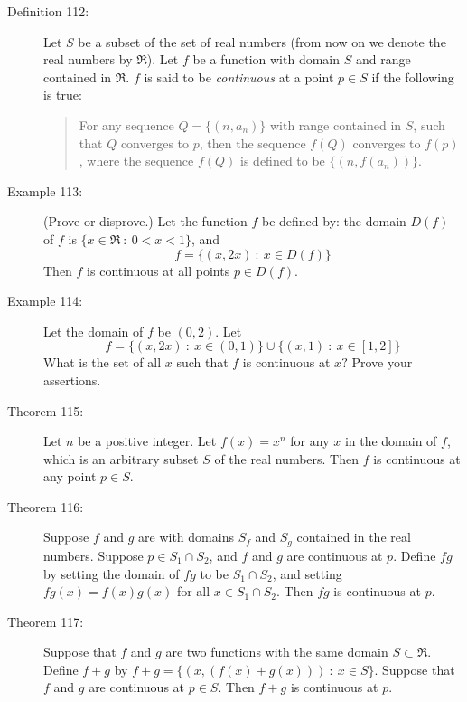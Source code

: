 \documentclass{article}
\begin{document}
\begin{description}

  \item[Definition 112:] Let $S$ be a subset of the set of real numbers (from now on we denote the real numbers by $\Re$). Let $f$ be a function with domain $S$ and range contained in $\Re$. $f$ is said to be \emph{continuous} at a point $p \in S$ if the following is true: 
    \begin{quote}
    For any sequence $Q = \{ (n, a_{n}) \}$ with range contained in $S$, such that $Q$ converges to $p$, then the sequence $f(Q)$ converges to $f(p)$, where the sequence $f(Q)$ is defined to be $\{ (n, f(a_{n}) ) \}$.
    \end{quote}

  \item[Example 113:] (Prove or disprove.) Let the function $f$ be defined by: the domain $D(f)$ of $f$ is $\{ x \in \Re\ :\ 0 < x < 1 \}$, and
    \begin{equation*}
    f = \{ (x, 2x)\ :\ x \in D(f) \}
    \end{equation*}
    Then $f$ is continuous at all points $p \in D(f)$. 

  \item[Example 114:] Let the domain of $f$ be $(0,2)$. Let
    \begin{equation*}
    f = \{ (x, 2x)\ :\ x \in (0,1) \} \cup \{ (x,1)\ :\ x \in [1,2] \}
    \end{equation*}
    What is the set of all $x$ such that $f$ is continuous at $x?$ Prove your assertions. 

  \item[Theorem 115:] Let $n$ be a positive integer. Let $f(x) = x^{n}$ for any $x$ in the domain of $f$, which is an arbitrary subset $S$ of the real numbers. Then $f$ is continuous at any point $p \in S$.

  \item[Theorem 116:] Suppose $f$ and $g$ are with domains $S_{f}$ and $S_{g}$ contained in the real numbers. Suppose $p \in S_{1} \cap S_{2}$, and $f$ and $g$ are continuous at $p$. Define $fg$ by setting the domain of $fg$ to be $S_{1} \cap S_{2}$, and setting $fg(x) = f(x) g(x) $ for all $x \in S_{1} \cap S_{2}$. Then $fg$ is continuous at $p$. 

  \item[Theorem 117:] Suppose that $f$ and $g$ are two functions with the same domain $S \subset \Re$. Define $f+g$ by $f+g = \{ (x, ( f(x)+g(x) ) )\ :\ x \in S \}$. Suppose that $f$ and $g$ are continuous at $p \in S$. Then $f+g$ is continuous at $p$.


\end{description}
\end{document}
